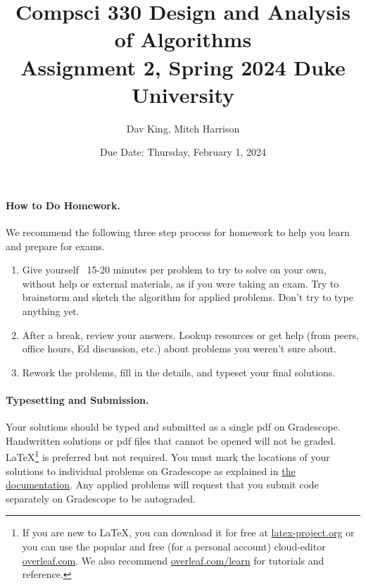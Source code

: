 \documentclass[11pt]{article}
\title{\vspace{-0.5in}Compsci 330 Design and Analysis of Algorithms \\Assignment 2, Spring 2024 Duke University}
\author{Dav King, Mitch Harrison}
\date{Due Date: Thursday, February 1, 2024}
\begin{document}
\maketitle



\paragraph{How to Do Homework.} We recommend the following three step process for homework to help you learn and prepare for exams.
\begin{enumerate}
	\item Give yourself ~15-20 minutes per problem to try to solve on your own, without help or external materials, as if you were taking an exam. Try to brainstorm and sketch the algorithm for applied problems. Don't try to type anything yet.
	\item After a break, review your answers. Lookup resources or get help (from peers, office hours, Ed discussion, etc.) about problems you weren't sure about.
	\item Rework the problems, fill in the details, and typeset your final solutions.
\end{enumerate}

\paragraph{Typesetting and Submission.} Your solutions should be typed and submitted as a single pdf on Gradescope. Handwritten solutions or pdf files that cannot be opened will not be graded. \LaTeX \footnote{If you are new to \LaTeX, you can download it for free at \href{https://www.latex-project.org}{latex-project.org} or you can use the popular and free (for a personal account) cloud-editor \href{https://www.overleaf.com}{overleaf.com}. We also recommend \href{https://www.overleaf.com/learn}{overleaf.com/learn} for tutorials and reference.} is preferred but not required. %
You must mark the locations of your solutions to individual problems on Gradescope as explained in \href{https://help.gradescope.com/article/ccbpppziu9-student-submit-work#submitting_a_pdf}{the documentation}. Any applied problems will request that you submit code separately on Gradescope to be autograded. 
\end{document}

